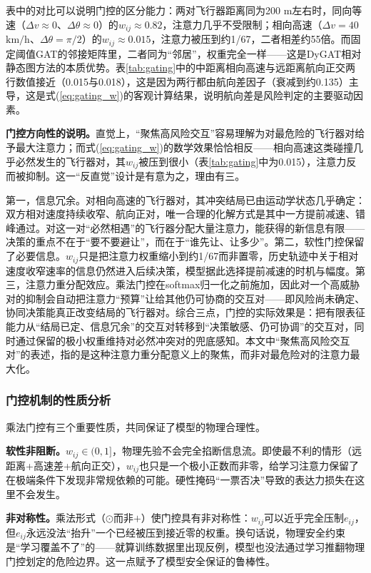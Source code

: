 \documentclass[12pt,a4paper,UTF8]{ctexart}
\begin{document}
表中的对比可以说明门控的区分能力：两对飞行器距离同为200 m左右时，同向等速（$\Delta v\approx0$、$\Delta\theta\approx0$）的$w_{ij}\approx0.82$，注意力几乎不受限制；相向高速（$\Delta v=40$ $\mathrm{km/h}$、$\Delta\theta=\pi/2$）的$w_{ij}\approx0.015$，注意力被压到约1/67，二者相差约55倍。而固定阈值GAT的邻接矩阵里，二者同为“邻居”，权重完全一样——这是DyGAT相对静态图方法的本质优势。表\ref{tab:gating}中的中距离相向高速与远距离航向正交两行数值接近（0.015与0.018），这是因为两行都由航向差因子（衰减到约0.135）主导，这是式(\ref{eq:gating_w})的客观计算结果，说明航向差是风险判定的主要驱动因素。

\textbf{门控方向性的说明。}直觉上，“聚焦高风险交互”容易理解为对最危险的飞行器对给予最大注意力；而式(\ref{eq:gating_w})的数学效果恰恰相反——相向高速这类碰撞几乎必然发生的飞行器对，其$w_{ij}$被压到很小（表\ref{tab:gating}中为0.015），注意力反而被抑制。这一“反直觉”设计是有意为之，理由有三。

第一，信息冗余。对相向高速的飞行器对，其冲突结局已由运动学状态几乎确定：双方相对速度持续收窄、航向正对，唯一合理的化解方式是其中一方提前减速、错峰通过。对这一对“必然相遇”的飞行器分配大量注意力，能获得的新信息有限——决策的重点不在于“要不要避让”，而在于“谁先让、让多少”。第二，软性门控保留了必要信息。$w_{ij}$只是把注意力权重缩小到约1/67而非置零，历史轨迹中关于相对速度收窄速率的信息仍然进入后续决策，模型据此选择提前减速的时机与幅度。第三，注意力重分配效应。乘法门控在softmax归一化之前施加，因此对一个高威胁对的抑制会自动把注意力“预算”让给其他仍可协商的交互对——即风险尚未确定、协同决策能真正改变结局的飞行器对。综合三点，门控的实际效果是：把有限表征能力从“结局已定、信息冗余”的交互对转移到“决策敏感、仍可协调”的交互对，同时通过保留的极小权重维持对必然冲突对的兜底感知。本文中“聚焦高风险交互对”的表述，指的是这种注意力重分配意义上的聚焦，而非对最危险对的注意力最大化。

\subsubsection{门控机制的性质分析}

乘法门控有三个重要性质，共同保证了模型的物理合理性。

\textbf{软性非阻断。}$w_{ij}\in(0,1]$，物理先验不会完全掐断信息流。即使最不利的情形（远距离+高速差+航向正交），$w_{ij}$也只是一个极小正数而非零，给学习注意力保留了在极端条件下发现非常规依赖的可能。硬性掩码“一票否决”导致的表达力损失在这里不会发生。

\textbf{非对称性。}乘法形式（$\odot$而非$+$）使门控具有非对称性：$w_{ij}$可以近乎完全压制$e_{ij}$，但$e_{ij}$永远没法“抬升”一个已经被压到接近零的权重。换句话说，物理安全约束是“学习覆盖不了”的——就算训练数据里出现反例，模型也没法通过学习推翻物理门控划定的危险边界。这一点赋予了模型安全保证的鲁棒性。
\end{document}
